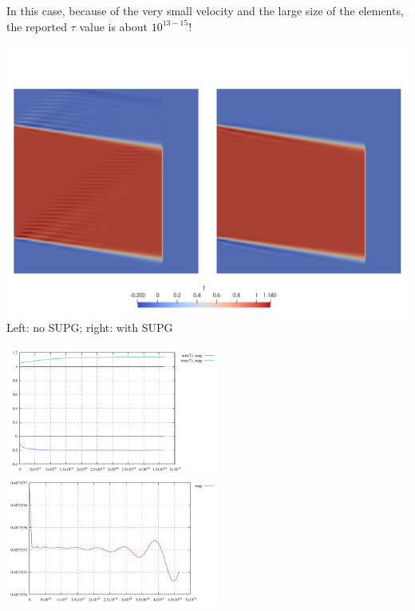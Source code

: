 In this case, because of the very small velocity and the large size of the elements,  
the reported $\tau$ value is about $10^{13-15}$! 

\begin{center}
\includegraphics[width=14cm]{python_codes/fieldstone_43/results/experiment6/T}\\
{\captionfont Left: no SUPG; right: with SUPG}
\end{center}

\begin{center}
\includegraphics[width=7cm]{python_codes/fieldstone_43/results/experiment6/stats_T}
\includegraphics[width=7cm]{python_codes/fieldstone_43/results/experiment6/avrg_T}
\end{center}


